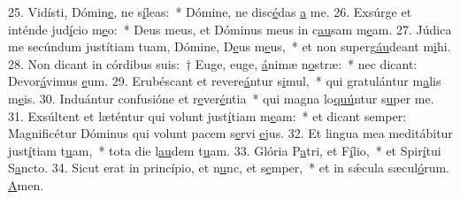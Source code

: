 25. Vidísti, Dómin\uline{e}, ne s\uline{í}leas:~* Dómine, ne disc\uline{é}das \uline{a} me.
26. Exsúrge et inténde jud\uline{í}cio m\uline{e}o:~* Deus meus, et Dóminus meus in c\uline{au}sam m\uline{e}am.
27. Júdica me secúndum justítiam tuam, Dómine, D\uline{e}us m\uline{e}us,~* et non superg\uline{áu}deant m\uline{i}hi.
28. Non dicant in córdibus suis:~† Euge, euge, \uline{á}nimæ n\uline{o}stræ:~* nec dicant: Devor\uline{á}vimus \uline{e}um.
29. Erubéscant et revere\uline{á}ntur s\uline{i}mul,~* qui gratulántur m\uline{a}lis m\uline{e}is.
30. Induántur confusióne et r\uline{e}ver\uline{é}ntia~* qui magna lo\uline{quú}ntur s\uline{u}per me.
31. Exsúltent et læténtur qui volunt just\uline{í}tiam m\uline{e}am:~* et dicant semper: Magnificétur Dóminus qui volunt pacem s\uline{e}rvi \uline{e}jus.
32. Et lingua mea meditábitur just\uline{í}tiam t\uline{u}am,~* tota die l\uline{au}dem t\uline{u}am.
33. Glória P\uline{a}tri, et F\uline{í}lio,~* et Spir\uline{í}tui S\uline{a}ncto.
34. Sicut erat in princípio, et n\uline{u}nc, et s\uline{e}mper,~* et in sǽcula sæcul\uline{ó}rum. \uline{A}men.
